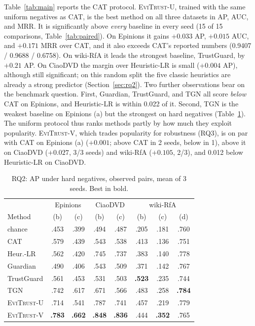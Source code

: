 \documentclass[conference]{IEEEtran}
\newcommand{\eviU}{\textsc{EviTrust}-U}
\newcommand{\eviV}{\textsc{EviTrust}-V}
\begin{document}
Table~\ref{tab:main} reports the CAT protocol. \eviU{}, trained with the same uniform negatives as CAT, is the best method on all three datasets in AP, AUC, and MRR. It is significantly above \emph{every} baseline in every seed (15 of 15 comparisons, Table~\ref{tab:paired}). On Epinions it gains $+0.033$ AP, $+0.015$ AUC, and $+0.171$ MRR over CAT, and it also exceeds CAT's reported numbers (0.9407 / 0.9688 / 0.6758). On wiki-RfA it leads the strongest baseline, TrustGuard, by $+0.21$ AP. On CiaoDVD the margin over Heuristic-LR is small ($+0.004$ AP), although still significant; on this random split the five classic heuristics are already a strong predictor (Section~\ref{sec:rq2}).
Two further observations bear on the benchmark question. First, Guardian, TrustGuard, and TGN all score \emph{below} CAT on Epinions, and Heuristic-LR is within 0.022 of it. Second, TGN is the weakest baseline on Epinions (a) but the strongest on hard negatives (Table~\ref{tab:hard}). The uniform protocol thus ranks methods partly by how much they exploit popularity.
\eviV{}, which trades popularity for robustness (RQ3), is on par with CAT on Epinions (a) ($+0.001$; above CAT in 2 seeds, below in 1), above it on CiaoDVD ($+0.027$, 3/3 seeds) and wiki-RfA ($+0.105$, 2/3), and 0.012 below Heuristic-LR on CiaoDVD.

\begin{table}[t]
\centering
\caption{RQ2: AP under hard negatives, observed pairs, mean of 3 seeds. Best in bold.}
\label{tab:hard}
\setlength{\tabcolsep}{2.6pt}
\begin{tabular}{l|cc|cc|ccc}
\toprule
& \multicolumn{2}{c|}{Epinions} & \multicolumn{2}{c|}{CiaoDVD} & \multicolumn{3}{c}{wiki-RfA} \\
Method & (b) & (c) & (b) & (c) & (b) & (c) & (d) \\
\midrule
chance & .453 & .399 & .494 & .487 & .205 & .181 & .760 \\
CAT & .579 & .439 & .543 & .538 & .413 & .136 & .751 \\
Heur.-LR & .562 & .420 & .745 & .737 & .383 & .140 & .778 \\
Guardian & .490 & .406 & .543 & .509 & .371 & .142 & .767 \\
TrustGuard & .561 & .453 & .531 & .503 & \textbf{.523} & .235 & .744 \\
TGN & .742 & .617 & .671 & .566 & .483 & .258 & \textbf{.784} \\
\midrule
\eviU{} & .714 & .541 & .787 & .741 & .457 & .219 & .779 \\
\eviV{} & \textbf{.783} & \textbf{.662} & \textbf{.848} & \textbf{.836} & .444 & \textbf{.352} & .765 \\
\bottomrule
\end{tabular}
\end{table}
\end{document}
